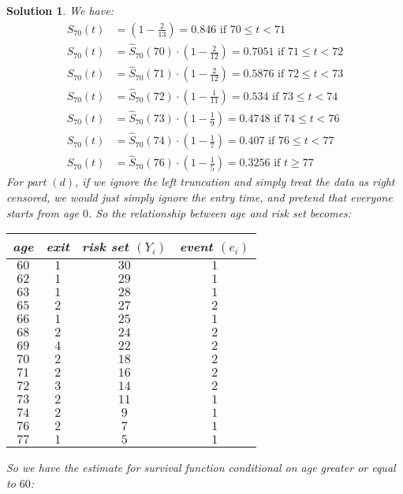 \documentclass[11pt]{article}
\newtheorem{sol}{Solution}
\begin{document}
\begin{sol}
	We have:
	\begin{align*}
		\hat{S}_{70}(t) &= (1 - \frac{2}{13}) = 0.846 \text{ if } 70 \leq t < 71\\
		\hat{S}_{70}(t) &= \hat{S}_{70}(70)\cdot (1 - \frac{2}{12}) = 0.7051 \text{ if } 71 \leq t < 72\\
		\hat{S}_{70}(t) &= \hat{S}_{70}(71)\cdot (1 - \frac{2}{12}) = 0.5876 \text{ if } 72 \leq t < 73\\
		\hat{S}_{70}(t) &= \hat{S}_{70}(72)\cdot (1 - \frac{1}{11}) = 0.534 \text{ if } 73 \leq t < 74\\
		\hat{S}_{70}(t) &= \hat{S}_{70}(73) \cdot (1 - \frac{1}{9}) = 0.4748 \text{ if } 74 \leq t  < 76\\
		\hat{S}_{70}(t) &= \hat{S}_{70}(74) \cdot (1 - \frac{1}{7})  = 0.407\text{ if }76 \leq t < 77\\
		\hat{S}_{70}(t) &= \hat{S}_{70}(76) \cdot (1 - \frac{1}{5}) = 0.3256 \text{ if } t \geq 77
	\end{align*}
	For part $(d)$, if we ignore the left truncation and simply treat the data as right censored, we would just simply ignore the entry time, and pretend that everyone starts from age $0$. So the relationship between age and risk set becomes:
	\begin{center}
		\begin{tabular}{cccc}
			age&exit&risk set $(Y_i)$ & event $(e_i)$\\
			\hline
			$60$ & $1$ & $30$ & $1$\\
			$62$ & $1$ & $29$ & $1$\\
			$63$ & $1$ & $28$ & $1$\\
			$65$ & $2$ & $27$ & $2$\\
			$66$ & $1$ & $25$ & $1$\\
			$68$ & $2$ & $24$ & $2$\\
			$69$ & $4$ & $22$ & $2$\\
			$70$ & $2$ & $18$ & $2$\\
			$71$ & $2$ & $16$ & $2$\\
			$72$ & $3$ & $14$ & $2$\\
			$73$ & $2$ & $11$ & $1$\\
			$74$ & $2$ & $ 9$ & $1$\\
			$76$ & $2$ & $ 7$ & $1$\\
			$77$ & $1$ & $ 5$ & $1$\\
		\end{tabular}
		\end{center}
		So we have the estimate for survival function conditional on age greater or equal to $60$:

\end{sol}
\end{document}
